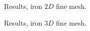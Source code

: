 %
\begin{figure}[h!]
    \centering
    \caption{Results, iron $2D$ fine mesh.}
    \label{example-0111-iron-2D-fig}
\end{figure}
%
\begin{figure}[h!]
    \centering
    \caption{Results, iron $3D$ fine mesh.}
    \label{example-0111-iron-3D-fig}
\end{figure}
